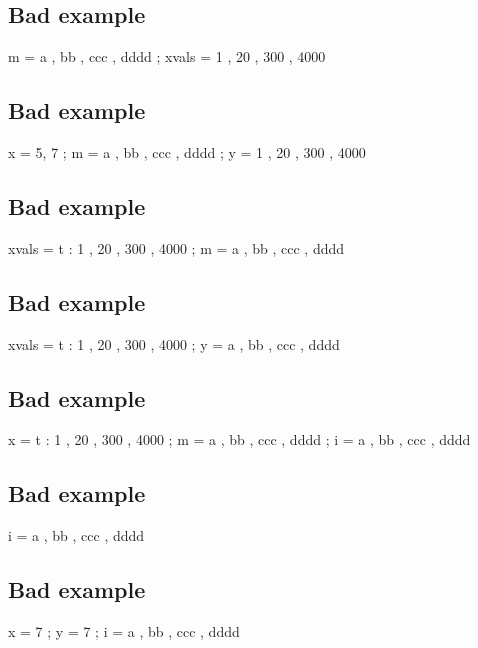 \documentclass{tutodoc}
\begin{document}
\subsection{Bad example \thesubsection}

\begin{functable}
    m     = a , bb , ccc , dddd ;
    xvals = 1 , 20 , 300 , 4000
\end{functable}


\subsection{Bad example \thesubsection}

\begin{functable}
    x = 5, 7 ;
    m = a , bb , ccc , dddd ;
    y = 1 , 20 , 300 , 4000
\end{functable}


\subsection{Bad example \thesubsection}

\begin{functable}
    xvals = t : 1 , 20 , 300 , 4000 ;
    m     = a , bb , ccc , dddd
\end{functable}


\subsection{Bad example \thesubsection}

\begin{functable}
    xvals = t : 1 , 20 , 300 , 4000 ;
    y     = a , bb , ccc , dddd
\end{functable}


\subsection{Bad example \thesubsection}

\begin{functable}
    x = t : 1 , 20 , 300 , 4000 ;
    m = a , bb , ccc , dddd ;
    i = a , bb , ccc , dddd
\end{functable}


\subsection{Bad example \thesubsection}

\begin{functable}
    i = a , bb , ccc , dddd
\end{functable}


\subsection{Bad example \thesubsection}

\begin{functable}
    x = 7 ;
    y = 7 ;
    i = a , bb , ccc , dddd
\end{functable}
\end{document}
